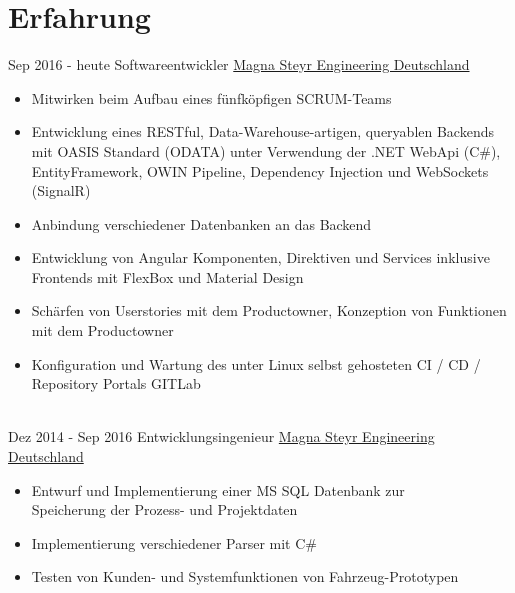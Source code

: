\documentclass[a4paper]{twentysecondcv} %
\begin{document}
\makeprofile %


\section{Erfahrung}

\begin{twenty} %
\twentyitem
    	{Sep 2016 -}
		{heute}
        {Softwareentwickler}
        {\href{https://www.magna.com/de}{Magna Steyr Engineering Deutschland}}
        {}
        {\begin{itemize}
        \item Mitwirken beim Aufbau eines fünfköpfigen SCRUM-Teams
        \item Entwicklung eines RESTful, Data-Warehouse-artigen, queryablen Backends mit OASIS Standard (ODATA) unter Verwendung der .NET WebApi (C\#), EntityFramework, OWIN Pipeline, Dependency Injection und WebSockets (SignalR)
        \item Anbindung verschiedener Datenbanken an das Backend
        \item Entwicklung von Angular Komponenten, Direktiven und Services inklusive Frontends mit FlexBox und Material Design
        \item Schärfen von Userstories mit dem Productowner, Konzeption von Funktionen mit dem Productowner
        \item Konfiguration und Wartung des unter Linux selbst gehosteten CI / CD / Repository Portals GITLab
        \end{itemize}}
        \\
	\twentyitem
    	{Dez 2014 -}
		{Sep 2016}
        {Entwicklungsingenieur}
        {\href{https://www.magna.com/de}{Magna Steyr Engineering Deutschland}}
        {}
        {
        {\begin{itemize}
        \item Entwurf und Implementierung einer MS SQL Datenbank zur \\ 
        Speicherung der Prozess- und Projektdaten
        \item Implementierung verschiedener Parser mit C\#
        \item Testen von Kunden- und Systemfunktionen von Fahrzeug-Prototypen
    \end{itemize}}
}
\end{twenty}
\end{document}
